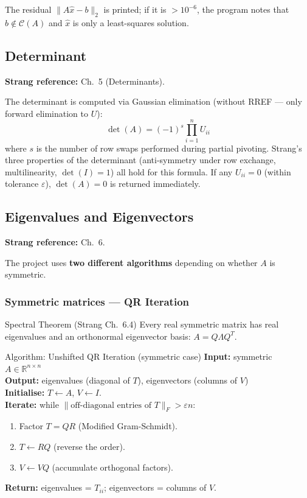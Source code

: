 \documentclass[12pt, a4paper]{article}
\newcommand{\R}{\mathbb{R}}
\newcommand{\Col}{\mathcal{C}}
\begin{document}
The residual $\|A\hat{x} - b\|_2$ is printed; if it is $> 10^{-6}$, the
program notes that $b \notin \Col(A)$ and $\hat{x}$ is only a least-squares
solution.

\subsection{Determinant}

\textbf{Strang reference:} Ch.\ 5 (Determinants).

The determinant is computed via Gaussian elimination (without RREF — only
forward elimination to $U$):
\[
  \det(A) = (-1)^s \prod_{i=1}^n U_{ii}
\]
where $s$ is the number of row swaps performed during partial pivoting.
Strang's three properties of the determinant (anti-symmetry under row
exchange, multilinearity, $\det(I)=1$) all hold for this formula.  If any
$U_{ii} = 0$ (within tolerance $\varepsilon$), $\det(A) = 0$ is returned
immediately.

\subsection{Eigenvalues and Eigenvectors}

\textbf{Strang reference:} Ch.\ 6.

The project uses \textbf{two different algorithms} depending on whether $A$
is symmetric.

\subsubsection{Symmetric matrices — QR Iteration}

\begin{strangbox}{Spectral Theorem (Strang Ch.\ 6.4)}
Every real symmetric matrix has real eigenvalues and an orthonormal eigenvector
basis: $A = Q\Lambda Q^T$.
\end{strangbox}

\begin{algobox}{Algorithm: Unshifted QR Iteration (symmetric case)}
\textbf{Input:} symmetric $A \in \R^{n \times n}$\\
\textbf{Output:} eigenvalues (diagonal of $T$), eigenvectors (columns of $V$)\\
\textbf{Initialise:} $T \leftarrow A$, $V \leftarrow I$.\\
\textbf{Iterate:} while
$\|\text{off-diagonal entries of }T\|_F > \varepsilon n$:
\begin{enumerate}[leftmargin=*, noitemsep]
  \item Factor $T = QR$ (Modified Gram-Schmidt).
  \item $T \leftarrow RQ$ \quad (reverse the order).
  \item $V \leftarrow VQ$ \quad (accumulate orthogonal factors).
\end{enumerate}
\textbf{Return:} eigenvalues = $T_{ii}$; eigenvectors = columns of $V$.
\end{algobox}
\end{document}
